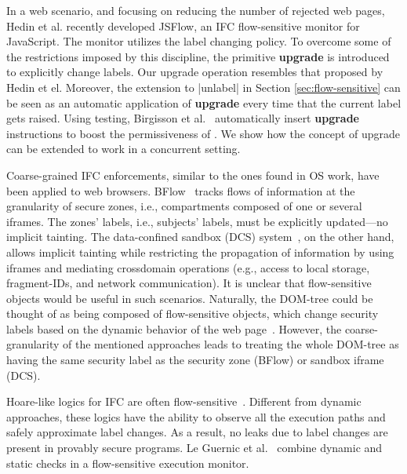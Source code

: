 In a web scenario, and focusing on reducing the number of rejected web pages,
Hedin et al. \citep{Hedin13} recently developed JSFlow, an IFC flow-sensitive
monitor for JavaScript. The monitor utilizes the {\nsu} label changing
policy. To overcome some of the restrictions imposed by this discipline, the
primitive \textbf{upgrade} is introduced to explicitly change labels. Our
upgrade operation resembles that proposed by Hedin et el. Moreover, the
extension to |unlabel| in Section \ref{sec:flow-sensitive} can be seen as an
automatic application of \textbf{upgrade} every time that the current label gets
raised. Using testing, Birgisson et al.~\citep{Arnar2012} automatically insert
\textbf{upgrade} instructions to boost the permissiveness of {\nsu}. We show how
the concept of upgrade can be extended to work in a concurrent setting.



Coarse-grained IFC enforcements, similar to the ones found in OS work, have been
applied to web browsers. BFlow~\citep{Yip:2009} tracks flows of information at
the granularity of secure zones, i.e., compartments composed of one or several
iframes. The zones' labels, i.e., subjects' labels, must be explicitly updated---no
implicit tainting. The data-confined sandbox (DCS)
system~\citep{conf/esorics/AkhaweLHSS13}, on the other hand, allows implicit
tainting while restricting the propagation of information by using iframes and
mediating crossdomain operations (e.g., access to local storage, fragment-IDs, and
network communication). It is unclear that flow-sensitive objects would be
useful in such scenarios. Naturally, the DOM-tree could be thought of as being
composed of flow-sensitive objects, which change security labels based on the
dynamic behavior of the web page~\citep{Russo:2009}. However, the
coarse-granularity of the mentioned approaches leads to treating the whole DOM-tree
as having the same security label as the security zone (BFlow) or sandbox iframe
(DCS). 

Hoare-like logics for IFC are often
flow-sensitive~\citep[e.g.][]{Amtoft:2006,Nanevski:2011}. Different from dynamic
approaches, these logics have the ability to observe all the execution paths and
safely approximate label changes. As a result, no leaks due to label changes are
present in provably secure programs.
Le Guernic et al.~\citep{LeGuernic:2006,Guernic:2007:ACM} combine dynamic and
static checks in a flow-sensitive execution monitor. 




 




